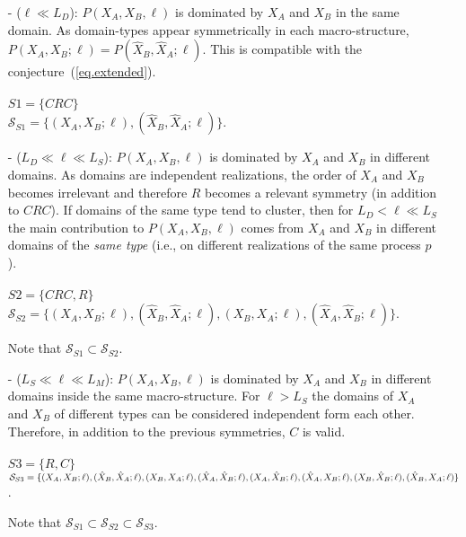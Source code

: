 \documentclass[fleqn,10pt]{wlscirep}
\begin{document}
 \begin{itemize}\label{hierarchy}
\item[-]($\ell  \ll L_D$): $P(X_A,X_B,\ell)$ is dominated by $X_A$ and $X_B$  in the same domain. As  domain-types appear symmetrically in each macro-structure, $P(X_A,X_B;\ell)= P(\hat{X}_B,\hat{X}_A;\ell)$. This is compatible with the conjecture~(\ref{eq.extended}).\\ 
\\
$S1=\{CRC\}$\\
$\mathcal{S}_{S1}=\{ ( X_A,X_B;\ell) ,(\hat{X}_B,\hat{X}_A;\ell) \}$.
\\

\item[-] ($L_D \ll \ell \ll L_{S}$): $P(X_A,X_B,\ell)$ is dominated  by $X_A$ and $X_B$ in  different domains. As domains are independent realizations, the  order of $X_A$ and $X_B$ becomes irrelevant and therefore $R$ becomes a relevant symmetry (in addition to $CRC$). If domains of the same type tend to cluster, then  for $L_D < \ell  \ll L_{S}$ the  main  contribution to $P(X_A,X_B,\ell)$ comes from  $X_A$ and $X_B$ in different domains of the {\it same type} (i.e., on different realizations of the same process $p$).\\
\\
$S2 =\{CRC,R \}$\\
$\mathcal{S}_{S2}=\{ ( X_A,X_B;\ell ) ,  (\hat{X}_B,\hat{X}_A;\ell), (X_B,X_A;\ell), (\hat{X}_A,\hat{X}_B;\ell) \}$.

Note that $\mathcal{S}_{S1} \subset \mathcal{S}_{S2}$.
\\

\item[-]($L_{S} \ll \ell \ll L_M$): $P(X_A,X_B,\ell)$ is dominated  by  $X_A$ and $X_B$  in different domains inside the same macro-structure. For $\ell > L_S$ the domains of $X_A$ and $X_B$ of different types can be considered independent form each other. Therefore, in addition to the previous symmetries,  $C$ is valid.\\
\\
$S3=\{R,C \}$\\
$\mathcal{S}_{S3}=\{ (X_A,X_B;\ell), (\hat{X}_B,\hat{X}_A;\ell), (X_B,X_A;\ell), (\hat{X}_A,\hat{X}_B;\ell), \\  (X_A,\hat{X}_B;\ell), (\hat{X}_A,X_B;\ell), (X_B,\hat{X}_B;\ell), (\hat{X}_B,X_A;\ell) \}$.

Note that $\mathcal{S}_{S1} \subset \mathcal{S}_{S2} \subset \mathcal{S}_{S3}$.  
\\


\end{itemize}
\end{document}
